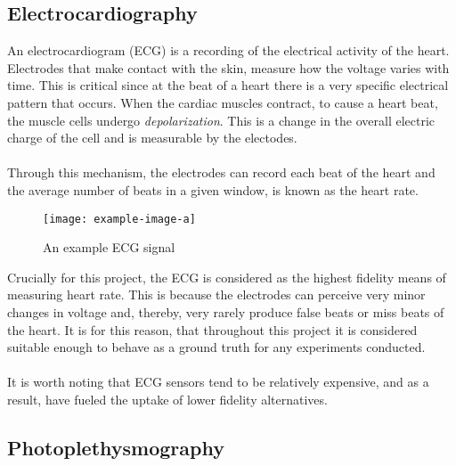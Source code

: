 \subsection{Electrocardiography}
An electrocardiogram (ECG) is a recording of the electrical activity of the heart. Electrodes that make contact with the skin, measure how the voltage varies with time.
This is critical since at the beat of a heart there is a very specific electrical pattern that occurs. When the cardiac muscles contract, to cause a heart beat, the muscle cells undergo
\textit{depolarization}. This is a change in the overall electric charge of the cell and is measurable by the electodes. \\\\
Through this mechanism, the electrodes can record each beat of the heart and the average number of beats in a given window, is known as the heart rate.
\begin{figure}[H]
    \texttt{[image: example-image-a]}
   \caption{An example ECG signal} 
\end{figure}
\noindent
Crucially for this project, the ECG is considered as the highest fidelity means of measuring heart rate. This is because the electrodes can perceive very minor changes in voltage and, thereby, very rarely produce false beats or miss beats of the heart. It is for this reason, that throughout this project it is considered suitable enough to behave as a ground truth for any experiments conducted.
\\\\
It is worth noting that ECG sensors tend to be relatively expensive, and as a result, have fueled the uptake of lower fidelity alternatives.

\subsection{Photoplethysmography}

